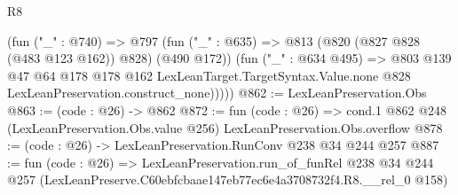 \begin{lexlean}{R8}
\begin{coremodule}
          (fun ("_" : @740) =>
          @797
            (fun ("_" : @635) => @813 (@820 (@827 @828 (@483 @123 @162)) @828) (@490 @172))
            (fun ("_" : @634 @495) =>
            @803
              @139
              @47
              @64
              @178
              @178
              @162
              LexLeanTarget.TargetSyntax.Value.none
              @828
              LexLeanPreservation.construct_none)))))
@862 := LexLeanPreservation.Obs
@863 := (code : @26) -> @862
@872 := fun (code : @26) =>
  cond.{1} @862 @248 (LexLeanPreservation.Obs.value @256) LexLeanPreservation.Obs.overflow
@878 := (code : @26) -> LexLeanPreservation.RunConv @238 @34 @244 @257
@887 := fun (code : @26) =>
  LexLeanPreservation.run_of_funRel
    @238
    @34
    @244
    @257
    (LexLeanPreserve.C60ebfcbaae147eb77ec6e4a3708732f4.R8.__rel_0 @158)
\end{coremodule}
\end{lexlean}
